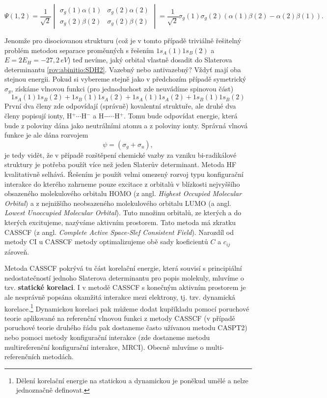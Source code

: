 \begin{equation}
\Psi (1,2)=\frac{1}{\sqrt{2}}
\begin{vmatrix}
\sigma_g(1)\alpha (1) & \sigma_g(2)\alpha (2) \\
\sigma_g(2)\beta (2) & \sigma_g(2)\beta (2)
\end{vmatrix}
=\frac{1}{\sqrt{2}}\sigma_g(1)\sigma_g(2)(\alpha (1)\beta (2)-\alpha (2)\beta (1)) .
\label{rov:abinitio:SDH2}
\end{equation}

Jenomže pro disociovanou strukturu (což je v tomto  případě triviálně řešitelný problém metodou separace proměnných s řešením $1s_A(1)1s_B(2)$ a $E=2E_H=-27,2\,eV$) teď nevíme, jaký orbital vlastně dosadit do Slaterova determinantu \ref{rov:abinitio:SDH2}. Vazebný nebo antivazebný? Vždyť mají oba stejnou energii. Pokud si vybereme stejně jako v předchozím případě symetrický $\sigma_g$, získáme vlnovou funkci (pro jednoduchost zde neuvádíme spinovou část)
\begin{equation}
1s_A(1)1s_B(2)+1s_B(1)1s_A(2)+1s_A(1)1s_A(2)+ 1s_B(1)1s_B(2)
\end{equation}
První dva členy zde odpovídají (správně) kovalentní struktuře, ale druhé dva členy popisují ionty, H$^+\cdots$H$^-$ a H$-\cdots$H$^+$. Tomu bude odpovídat energie, která bude z poloviny dána jako neutrálními atomu a z poloviny ionty. Správná vlnová funkce je ale dána rozvojem
\begin{equation}
\psi= (\sigma_g+\sigma_u), 
\end{equation}
je tedy vidět, že v případě rozštěpení chemické vazby za vzniku bi-radikálové struktury je potřeba použít více než jeden Slaterův determinant. Metoda HF kvalitativně selhává. Ŕešením je použít velmi omezený rozvoj typu konfigurační interakce do kterého zahrneme pouze excitace z orbitalů v blízkosti nejvyššího obsazeného molekulového orbitalu HOMO (z angl. \textit{Highest Occupied Molecular Orbital}) a z nejnižšího neobsazeného molekulového orbitalu LUMO (a angl. \textit{Lowest Unoccupied Molecular Orbital}). Tuto množinu orbitalů, ze kterých a do kterých excitujeme, nazýváme aktivním prostorem. Tato metoda má zkratku CASSCF (z angl. \textit{Complete Active Space-Slef Consistent Field}). Narozdíl od metody CI u CASSCF metody optimalizujeme obě sady koeficientů $C$ a $c_{ij}$ zároveň. 

Metoda CASSCF pokrývá tu část korelační energie, která souvisí s principiální nedostatečností jednoho Slaterova determinantu pro popis molekuly, mluvíme o tzv. \textbf{statické korelaci}. I v metodě CASSCF s konečným aktivním prostorem je ale nesprávně popsána okamžitá interakce mezi elektrony, tj. tzv. dynamická korelace.\footnote{Dělení korelační energie na statickou a dynamickou je poněkud umělé a nelze jednoznačně definovat.} Dynamickou korelaci pak můžeme dodat kupříkladu pomocí poruchové teorie aplikované na referenční vlnovou funkci z metody CASSCF (v případě poruchové teorie druhého řádu pak dostaneme často užívanou metodu CASPT2) nebo pomoci metody konfigurační interakce (zde dostaneme metodu multireferenční konfigurační interakce, MRCI). Obecně mluvíme o multi-referenčních metodách.

